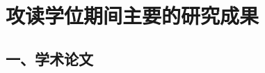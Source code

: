 
{~}
\vspace{18pt}
\section{攻读学位期间主要的研究成果} %

\ifblindreview
\fi
\vspace{11pt}
\subsection*{一、学术论文}

\ifblindreview



